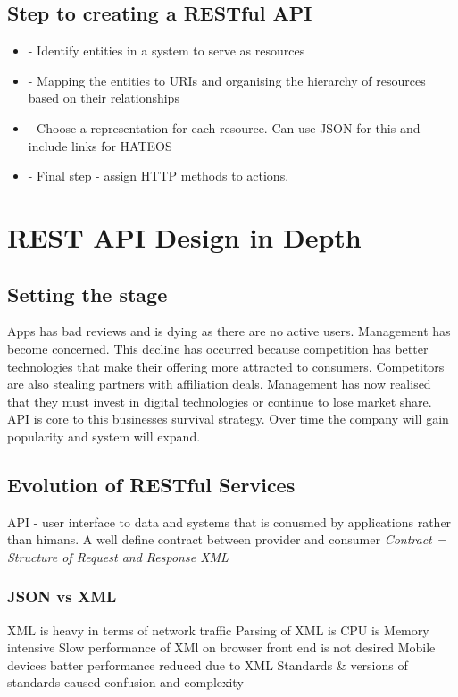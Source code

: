 \documentclass[a4paper, 11pt]{book}
\begin{document}
    \subsection{Step to creating a RESTful API}
    \begin{itemize}
        \item - Identify entities in a system to serve as resources
        \item - Mapping the entities to URIs and organising the hierarchy of resources based on their relationships
        \item - Choose a representation for each resource. Can use JSON for this and include links for HATEOS
        \item - Final step - assign HTTP methods to actions.
    \end{itemize}


    \section{REST API Design in Depth}

    \subsection{Setting the stage}
    Apps has bad reviews and is dying as there are no active users.
    Management has become concerned.
    This decline has occurred because competition has better technologies that make their offering more attracted to consumers.
    Competitors are also stealing partners with affiliation deals.
    Management has now realised that they must invest in digital technologies or continue to lose market share.
    API is core to this businesses survival strategy.
    Over time the company will gain popularity and system will expand.

    \subsection{Evolution of RESTful Services}
    API - user interface to data and systems that is conusmed by applications rather than himans.
    A well define contract between provider and consumer
    \textit{Contract = Structure of Request and Response XML}

    \subsubsection{JSON vs XML}
    XML is heavy in terms of network traffic
    Parsing of XML is CPU is Memory intensive
    Slow performance of XMl on browser front end is not desired
    Mobile devices batter performance reduced due to XML
    Standards \& versions of standards caused confusion and complexity
\end{document}
